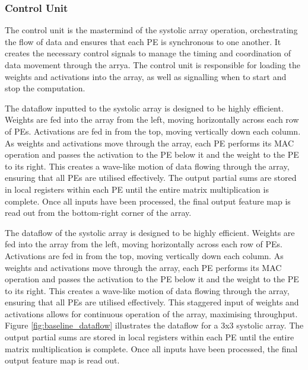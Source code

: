 \documentclass[12pt, a4paper, ukenglish]{article}
\begin{document}
    \subsubsection{Control Unit} \label{sec: baseline cu}
    The control unit is the mastermind of the systolic array operation, orchestrating the flow of data and ensures that each PE is synchronous to one another. It creates the necessary control signals to manage the timing and coordination of data movement through the arrya. The control unit is responsible for loading the weights and activations into the array, as well as signalling when to start and stop the computation. 


    The dataflow inputted to the systolic array is designed to be highly efficient. Weights are fed into the array from the left, moving horizontally across each row of PEs. Activations are fed in from the top, moving vertically down each column. As weights and activations move through the array, each PE performs its MAC operation and passes the activation to the PE below it and the weight to the PE to its right. This creates a wave-like motion of data flowing through the array, ensuring that all PEs are utilised effectively. The output partial sums are stored in local registers within each PE until the entire matrix multiplication is complete. Once all inputs have been processed, the final output feature map is read out from the bottom-right corner of the array.

    The dataflow of the systolic array is designed to be highly efficient. Weights are fed into the array from the left, moving horizontally across each row of PEs. Activations are fed in from the top, moving vertically down each column. As weights and activations move through the array, each PE performs its MAC operation and passes the activation to the PE below it and the weight to the PE to its right. This creates a wave-like motion of data flowing through the array, ensuring that all PEs are utilised effectively. This staggered input of weights and activations allows for continuous operation of the array, maximising throughput. Figure \ref{fig:baseline_dataflow} illustrates the dataflow for a 3x3 systolic array. The output partial sums are stored in local registers within each PE until the entire matrix multiplication is complete. Once all inputs have been processed, the final output feature map is read out.  
\end{document}
